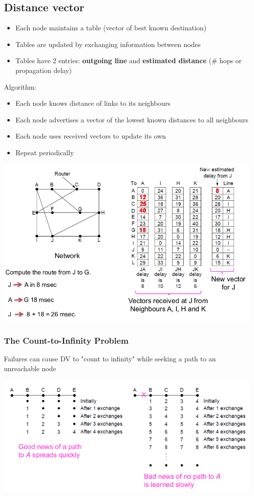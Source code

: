\documentclass{article}[18pt]
\begin{document}
\subsection{Distance vector}
\begin{itemize}
	\item Each node maintains a table (vector of best known destination)
	\item Tables are updated by exchanging information between nodes
	\item Tables have 2 entries: \textbf{outgoing line} and \textbf{estimated distance} (\# hops or propagation delay)
\end{itemize}
Algorithm:
\begin{itemize}
	\item Each node knows distance of links to its neighbours
	\item Each node advertises a vector of the lowest known distances to all neighbours
	\item Each node uses received vectors to update its own
	\item Repeat periodically
\end{itemize}
\begin{center}
	\includegraphics[scale=0.7]{distance_vector_routing}
\end{center}
\subsubsection{The Count-to-Infinity Problem}
Failures can cause DV to "count to infinity" while seeking a path to an unreachable node
\begin{center}
	\includegraphics[scale=0.7]{infinity}
\end{center}
\end{document}
